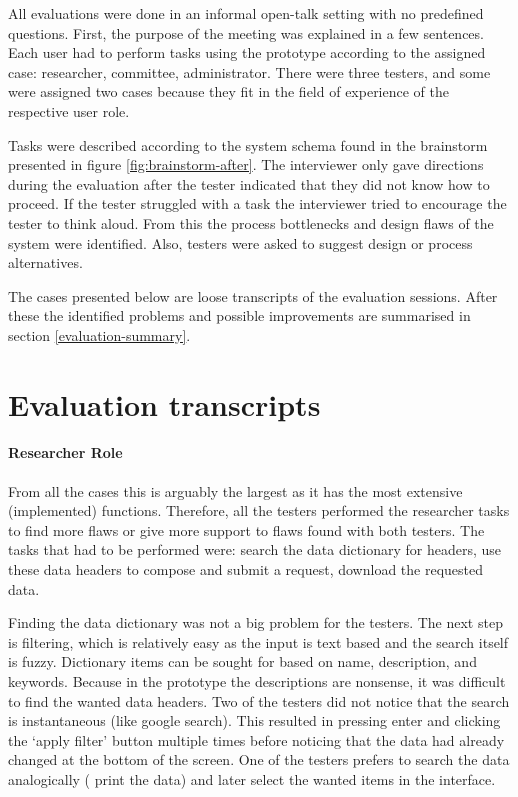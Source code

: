 All evaluations were done in an informal open-talk setting with no predefined questions.
First, the purpose of the meeting was explained in a few sentences.
Each user had to perform tasks using the prototype according to the assigned case: researcher, committee, administrator.
There were three testers, and some were assigned two cases because they fit in the field of experience of the respective user role.

Tasks were described according to the system schema found in the brainstorm presented in figure \ref{fig:brainstorm-after}.
The interviewer only gave directions during the evaluation after the tester indicated that they did not know how to proceed.
If the tester struggled with a task the interviewer tried to encourage the tester to think aloud.
From this the process bottlenecks and design flaws of the system were identified.
Also, testers were asked to suggest design or process alternatives.

The  cases presented below are loose transcripts of the evaluation sessions.
After these the identified problems and possible improvements are summarised in section \ref{evaluation-summary}.

\section{Evaluation transcripts}

\paragraph{Researcher Role}
From all the cases this is arguably the largest as it has the most extensive (implemented) functions.
Therefore, all the testers performed the researcher tasks to find more flaws or give more support to flaws found with both testers.
The tasks that had to be performed were: search the data dictionary for headers, use these data headers to compose and submit a request, download the requested data.

Finding the data dictionary was not a big problem for the testers.
The next step is filtering, which is relatively easy as the input is text based and the search itself is fuzzy.
Dictionary items can be sought for based on name, description, and keywords.
Because in the prototype the descriptions are nonsense, it was difficult to find the wanted data headers.
Two of the testers did not notice that the search is instantaneous (like google search).
This resulted in pressing enter and clicking the `apply filter' button multiple times before noticing that the data had already changed at the bottom of the screen.
One of the testers prefers to search the data analogically (\ie{} print the data) and later select the wanted items in the interface.

